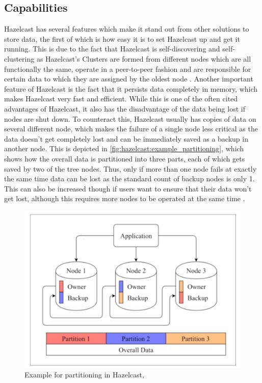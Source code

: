 \subsection{Capabilities} \label{subsec:capabilitiesHazelcast}
Hazelcast has several features which make it stand out from other solutions to store data, the first of which is how easy it is 
to set Hazelcast up and get it running. This is due to the fact that Hazelcast is self-discovering and self-clustering as Hazelcast's 
Clusters are formed from different nodes which are all functionally the same, operate in a peer-to-peer fashion and are responsible for 
certain data to which they are assigned by the oldest node \parencite{Johns.2015}. \newline
Another important feature of Hazelcast is the fact that it persists data completely in memory, which makes Hazelcast very fast and efficient.
While this is one of the often cited advantages of Hazelcast, it also has the disadvantage of the data being lost if nodes are shut down. To counteract this, Hazelcast usually has copies of data on several different node, which makes the failure of a single node less critical as the data doesn't get completely lost and can be immediately saved as a backup 
in another node. This is depicted in \autoref{fig:hazelcast:example_partitioning}, which shows how the overall data is partitioned into three parts, each of which gets saved by two of the tree nodes. Thus, only if more than 
one node fails at exactly the same time data can be lost as the standard count of backup nodes is only 1. This can also be increased though if users want to 
ensure that their data won't get lost, although this requires more nodes to be operated at the same time \parencite{Johns.2015}. \newline

\begin{figure}[H]
    \centering
    \includegraphics[width=16cm]{images/hazelcast_partitioning.png}
    \caption[Example for partitioning in Hazelcast]{Example for partitioning in Hazelcast, \parencite{Johns.2015}}
    \label{fig:hazelcast:example_partitioning}
\end{figure}

